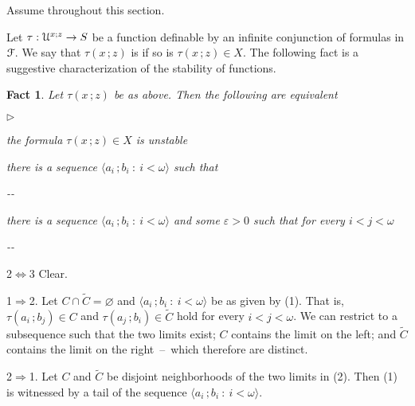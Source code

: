 \documentclass{amsproc}
\makeatletter
\newcommand{\mylabel}[1]{{#1}\hfill}
\renewenvironment{itemize}
  {\begin{list}{$\triangleright$}{%
  \setlength{\parskip}{0mm}
  \setlength{\topsep}{.1\baselineskip}
  \setlength{\rightmargin}{0mm}
  \setlength{\listparindent}{0mm}
  \setlength{\itemindent}{0mm}
  \setlength{\labelwidth}{3ex}
  \setlength{\itemsep}{.1\baselineskip}
  \setlength{\parsep}{.1\baselineskip}
  \setlength{\partopsep}{0mm}
  \setlength{\labelsep}{1ex}
  \setlength{\leftmargin}{\labelwidth+\labelsep}
  \let\makelabel\mylabel}}{%
\end{list}}
\newcounter{thm}
\theoremstyle{mio}
\newtheorem{fact}[thm]{Fact}\tcolorboxenvironment{fact}{mythm}
\providecommand{\proofNameStyle}{\bfseries}
\renewenvironment{proof}[1][\proofname]{\par
  \pushQED{\qed}%
  \normalfont%
  \trivlist
  \item[\hskip\labelsep
        \proofNameStyle
    #1\@addpunct{.}]\ignorespaces
}{%
  \popQED\endtrivlist\@endpefalse
}
\renewcommand*{\emph}[1]{%
   \smash{\tikz[baseline]\node[rectangle, fill=teal!25, rounded corners, inner xsep=0.5ex, inner ysep=0.2ex, anchor=base, minimum height = 2.7ex]{\strut #1};}}
\makeatother
\begin{document}
Assume \emph{$S=[0,1]$\/} throughout this section.

Let $\tau:{\EuScript U}^{x;z}\to S$ be a function definable by an infinite conjunction of formulas in ${\EuScript F}$.
We say that $\tau(x\,;z)$ is \emph{stable\/} if so is $\tau(x\,;z)\in X$.
The following fact is a suggestive characterization of the stability of functions.

\begin{fact}
  Let $\tau(x\,;z)$ be as above.
  Then the following are equivalent
  \begin{itemize}
    \item [1.] the formula $\tau(x\,;z)\in X$ is unstable
    \item [2.] there is a sequence $\langle a_i\,;b_i\ :\ i<\omega\rangle$ such that\smallskip
    
    \noindent\kern-\kern-

    \item [3.] there is a sequence $\langle a_i\,;b_i\ :\ i<\omega\rangle$ and some $\varepsilon>0$ such that for every $i<j<\omega$\smallskip
    
    \noindent\kern-\kern-



  \end{itemize}
\end{fact}

\begin{proof}
  2$\Leftrightarrow$3 Clear.

  1$\Rightarrow$2.
  Let $C\cap\tilde C=\varnothing$ and $\langle a_i\,;b_i\ :\ i<\omega\rangle$ be as given by (1).
  That is, $\tau(a_i\,;b_j)\in C$ and $\tau(a_j\,;b_i)\in \tilde C$ hold for every $i<j<\omega$.
  We can restrict to a subsequence such that the two limits exist; $C$ contains the limit on the left; and $\tilde C$ contains the limit on the right~--~which therefore are distinct.%

  2$\Rightarrow$1. Let $C$ and $\tilde C$ be disjoint neighborhoods of the two limits in (2).
  Then (1) is witnessed by a tail of the sequence $\langle a_i\,;b_i\ :\ i<\omega\rangle$.
\end{proof}
\end{document}
